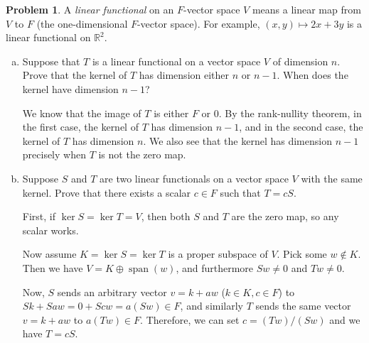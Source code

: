 \documentclass[11pt,oneside]{amsart}
\theoremstyle{definition}
\newtheorem{problem}{Problem}
\newcommand{\bR}{\mathbb{R}}
\DeclareMathOperator{\Span}{span}
\begin{document}
    \begin{problem}
        A \emph{linear functional} on an $F$-vector space $V$ means a linear map from $V$ to $F$ (the one-dimensional $F$-vector space). For example, $(x,y)\mapsto 2x+3y$ is a linear functional on $\bR^2$.
        
        \begin{enumerate}[(a)]
            \item Suppose that $T$ is a linear functional on a vector space $V$ of dimension $n$. Prove that the kernel of $T$ has dimension either $n$ or $n-1$. When does the kernel have dimension $n-1$?
            \begin{solution}
                We know that the image of $T$ is either $F$ or 0. By the rank-nullity theorem, in the first case, the kernel of $T$ has dimension $n-1$, and in the second case, the kernel of $T$ has dimension $n$. We also see that the kernel has dimension $n-1$ precisely when $T$ is not the zero map.
            \end{solution}
            \item Suppose $S$ and $T$ are two linear functionals on a vector space $V$ with the same kernel. Prove that there exists a scalar $c\in F$ such that $T=cS$.
            \begin{solution}
                First, if $\ker S=\ker T=V$, then both $S$ and $T$ are the zero map, so any scalar works.

                Now assume $K=\ker S=\ker T$ is a proper subspace of $V$. Pick some $w\notin K$. Then we have $V=K\oplus\Span(w)$, and furthermore $Sw\neq 0$ and $Tw\neq 0$.
                
                Now, $S$ sends an arbitrary vector $v=k+aw$ ($k\in K, c\in F$) to $Sk+Saw=0+Scw=a(Sw)\in F$, and similarly $T$ sends the same vector $v=k+aw$ to $a(Tw)\in F$. Therefore, we can set $c=(Tw)/(Sw)$ and we have $T=cS$.
            \end{solution}
        \end{enumerate}
    \end{problem}
    
\end{document}
